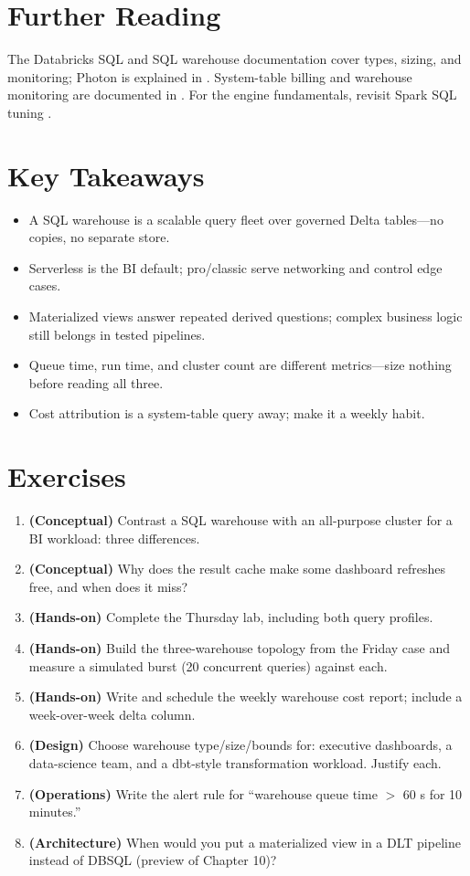 \section{Further Reading}
The Databricks SQL \cite{databricksSQL} and SQL warehouse \cite{databricksSQLWarehouses} documentation cover types, sizing, and monitoring; Photon is explained in \cite{databricksPhoton}. System-table billing and warehouse monitoring are documented in \cite{databricksSystemTables}. For the engine fundamentals, revisit Spark SQL tuning \cite{sparkSQLTuning}.

\section*{Key Takeaways}
\begin{itemize}
    \item A SQL warehouse is a scalable query fleet over governed Delta tables---no copies, no separate store.
    \item Serverless is the BI default; pro/classic serve networking and control edge cases.
    \item Materialized views answer repeated derived questions; complex business logic still belongs in tested pipelines.
    \item Queue time, run time, and cluster count are different metrics---size nothing before reading all three.
    \item Cost attribution is a system-table query away; make it a weekly habit.
\end{itemize}

\section{Exercises}
\begin{enumerate}
    \item \textbf{(Conceptual)} Contrast a SQL warehouse with an all-purpose cluster for a BI workload: three differences.
    \item \textbf{(Conceptual)} Why does the result cache make some dashboard refreshes free, and when does it miss?
    \item \textbf{(Hands-on)} Complete the Thursday lab, including both query profiles.
    \item \textbf{(Hands-on)} Build the three-warehouse topology from the Friday case and measure a simulated burst (20 concurrent queries) against each.
    \item \textbf{(Hands-on)} Write and schedule the weekly warehouse cost report; include a week-over-week delta column.
    \item \textbf{(Design)} Choose warehouse type/size/bounds for: executive dashboards, a data-science team, and a dbt-style transformation workload. Justify each.
    \item \textbf{(Operations)} Write the alert rule for ``warehouse queue time $>$ 60 s for 10 minutes.''
    \item \textbf{(Architecture)} When would you put a materialized view in a DLT pipeline instead of DBSQL (preview of Chapter 10)?
\end{enumerate}
